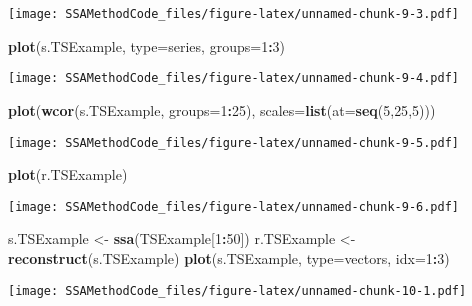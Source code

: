 \documentclass[
]{article}
\newenvironment{Shaded}{\begin{snugshade}}{\end{snugshade}}
\newcommand{\AttributeTok}[1]{\textcolor[rgb]{0.13,0.29,0.53}{#1}}
\newcommand{\DecValTok}[1]{\textcolor[rgb]{0.00,0.00,0.81}{#1}}
\newcommand{\FunctionTok}[1]{\textcolor[rgb]{0.13,0.29,0.53}{\textbf{#1}}}
\newcommand{\NormalTok}[1]{#1}
\newcommand{\OtherTok}[1]{\textcolor[rgb]{0.56,0.35,0.01}{#1}}
\newcommand{\SpecialCharTok}[1]{\textcolor[rgb]{0.81,0.36,0.00}{\textbf{#1}}}
\newcommand{\StringTok}[1]{\textcolor[rgb]{0.31,0.60,0.02}{#1}}
\begin{document}
\texttt{[image: SSAMethodCode\_files/figure-latex/unnamed-chunk-9-3.pdf]}

\begin{Shaded}
\begin{Highlighting}[]
\FunctionTok{plot}\NormalTok{(s.TSExample, }\AttributeTok{type=}\StringTok{\textquotesingle{}series\textquotesingle{}}\NormalTok{, }\AttributeTok{groups=}\DecValTok{1}\SpecialCharTok{:}\DecValTok{3}\NormalTok{)}
\end{Highlighting}
\end{Shaded}

\texttt{[image: SSAMethodCode\_files/figure-latex/unnamed-chunk-9-4.pdf]}

\begin{Shaded}
\begin{Highlighting}[]
\FunctionTok{plot}\NormalTok{(}\FunctionTok{wcor}\NormalTok{(s.TSExample, }\AttributeTok{groups=}\DecValTok{1}\SpecialCharTok{:}\DecValTok{25}\NormalTok{), }\AttributeTok{scales=}\FunctionTok{list}\NormalTok{(}\AttributeTok{at=}\FunctionTok{seq}\NormalTok{(}\DecValTok{5}\NormalTok{,}\DecValTok{25}\NormalTok{,}\DecValTok{5}\NormalTok{)))}
\end{Highlighting}
\end{Shaded}

\texttt{[image: SSAMethodCode\_files/figure-latex/unnamed-chunk-9-5.pdf]}

\begin{Shaded}
\begin{Highlighting}[]
\FunctionTok{plot}\NormalTok{(r.TSExample)}
\end{Highlighting}
\end{Shaded}

\texttt{[image: SSAMethodCode\_files/figure-latex/unnamed-chunk-9-6.pdf]}

\begin{Shaded}
\begin{Highlighting}[]
\NormalTok{s.TSExample }\OtherTok{\textless{}{-}} \FunctionTok{ssa}\NormalTok{(TSExample[}\DecValTok{1}\SpecialCharTok{:}\DecValTok{50}\NormalTok{])}
\NormalTok{r.TSExample }\OtherTok{\textless{}{-}} \FunctionTok{reconstruct}\NormalTok{(s.TSExample)}
\FunctionTok{plot}\NormalTok{(s.TSExample, }\AttributeTok{type=}\StringTok{\textquotesingle{}vectors\textquotesingle{}}\NormalTok{, }\AttributeTok{idx=}\DecValTok{1}\SpecialCharTok{:}\DecValTok{3}\NormalTok{)}
\end{Highlighting}
\end{Shaded}

\texttt{[image: SSAMethodCode\_files/figure-latex/unnamed-chunk-10-1.pdf]}
\end{document}
